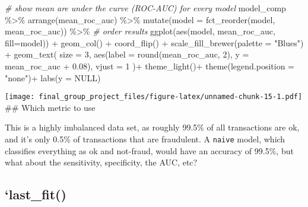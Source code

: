 \documentclass[
]{article}
\newenvironment{Shaded}{\begin{snugshade}}{\end{snugshade}}
\newcommand{\AttributeTok}[1]{\textcolor[rgb]{0.77,0.63,0.00}{#1}}
\newcommand{\CommentTok}[1]{\textcolor[rgb]{0.56,0.35,0.01}{\textit{#1}}}
\newcommand{\ConstantTok}[1]{\textcolor[rgb]{0.00,0.00,0.00}{#1}}
\newcommand{\DecValTok}[1]{\textcolor[rgb]{0.00,0.00,0.81}{#1}}
\newcommand{\FloatTok}[1]{\textcolor[rgb]{0.00,0.00,0.81}{#1}}
\newcommand{\FunctionTok}[1]{\textcolor[rgb]{0.00,0.00,0.00}{#1}}
\newcommand{\NormalTok}[1]{#1}
\newcommand{\SpecialCharTok}[1]{\textcolor[rgb]{0.00,0.00,0.00}{#1}}
\newcommand{\StringTok}[1]{\textcolor[rgb]{0.31,0.60,0.02}{#1}}
\begin{document}
\begin{Shaded}
\begin{Highlighting}[]
\CommentTok{\# show mean are under the curve (ROC{-}AUC) for every model}
\NormalTok{model\_comp }\SpecialCharTok{\%\textgreater{}\%} 
  \FunctionTok{arrange}\NormalTok{(mean\_roc\_auc) }\SpecialCharTok{\%\textgreater{}\%} 
  \FunctionTok{mutate}\NormalTok{(}\AttributeTok{model =} \FunctionTok{fct\_reorder}\NormalTok{(model, mean\_roc\_auc)) }\SpecialCharTok{\%\textgreater{}\%} \CommentTok{\# order results}
  \FunctionTok{ggplot}\NormalTok{(}\FunctionTok{aes}\NormalTok{(model, mean\_roc\_auc, }\AttributeTok{fill=}\NormalTok{model)) }\SpecialCharTok{+}
  \FunctionTok{geom\_col}\NormalTok{() }\SpecialCharTok{+}
  \FunctionTok{coord\_flip}\NormalTok{() }\SpecialCharTok{+}
  \FunctionTok{scale\_fill\_brewer}\NormalTok{(}\AttributeTok{palette =} \StringTok{"Blues"}\NormalTok{) }\SpecialCharTok{+}
   \FunctionTok{geom\_text}\NormalTok{(}
     \AttributeTok{size =} \DecValTok{3}\NormalTok{,}
     \FunctionTok{aes}\NormalTok{(}\AttributeTok{label =} \FunctionTok{round}\NormalTok{(mean\_roc\_auc, }\DecValTok{2}\NormalTok{), }
         \AttributeTok{y =}\NormalTok{ mean\_roc\_auc }\SpecialCharTok{+} \FloatTok{0.08}\NormalTok{),}
     \AttributeTok{vjust =} \DecValTok{1}
\NormalTok{  )}\SpecialCharTok{+}
  \FunctionTok{theme\_light}\NormalTok{()}\SpecialCharTok{+}
  \FunctionTok{theme}\NormalTok{(}\AttributeTok{legend.position =} \StringTok{"none"}\NormalTok{)}\SpecialCharTok{+}
  \FunctionTok{labs}\NormalTok{(}\AttributeTok{y =} \ConstantTok{NULL}\NormalTok{)}
\end{Highlighting}
\end{Shaded}

\texttt{[image: final\_group\_project\_files/figure-latex/unnamed-chunk-15-1.pdf]}
\#\# Which metric to use

This is a highly imbalanced data set, as roughly 99.5\% of all
transactions are ok, and it's only 0.5\% of transactions that are
fraudulent. A \texttt{naive} model, which classifies everything as ok
and not-fraud, would have an accuracy of 99.5\%, but what about the
sensitivity, specificity, the AUC, etc?

\hypertarget{last_fit}{%
\subsection{`last\_fit()}\label{last_fit}}
\end{document}
